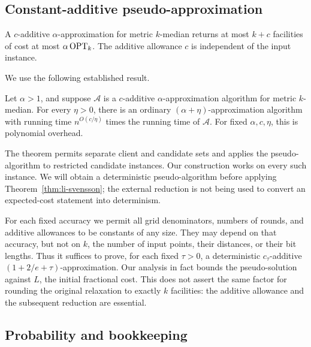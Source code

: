 \subsection{Constant-additive pseudo-approximation}

\begin{definition}
A \(c\)-additive \(\alpha\)-approximation for metric \(k\)-median returns
at most \(k+c\) facilities of cost at most \(\alpha\operatorname{OPT}_k\).
The additive allowance \(c\) is independent of the input instance.
\end{definition}

We use the following established result.

\begin{theorem}
\label{thm:li-svensson}
Let \(\alpha>1\), and suppose \(\mathcal A\) is a \(c\)-additive
\(\alpha\)-approximation algorithm for metric \(k\)-median.
For every \(\eta>0\), there is an ordinary
\((\alpha+\eta)\)-approximation algorithm with running time
\(n^{O(c/\eta)}\) times the running time of \(\mathcal A\).
For fixed \(\alpha,c,\eta\), this is polynomial overhead.
\end{theorem}

The theorem permits separate client and candidate sets and applies the
pseudo-algorithm to restricted candidate instances. Our construction works
on every such instance. We will obtain a deterministic pseudo-algorithm
before applying Theorem~\ref{thm:li-svensson}; the external reduction is not
being used to convert an expected-cost statement into determinism.

For each fixed accuracy we permit all grid denominators, numbers of rounds,
and additive allowances to be constants of any size. They may depend on
that accuracy, but not on \(k\), the number of input points, their distances,
or their bit lengths. Thus it suffices to prove, for each fixed
\(\tau>0\), a deterministic \(c_\tau\)-additive
\((1+2/e+\tau)\)-approximation. Our analysis in fact bounds the
pseudo-solution against \(L\), the initial fractional cost. This does not
assert the same factor for rounding the original relaxation to exactly
\(k\) facilities: the additive allowance and the subsequent reduction
are essential.

\subsection{Probability and bookkeeping}

